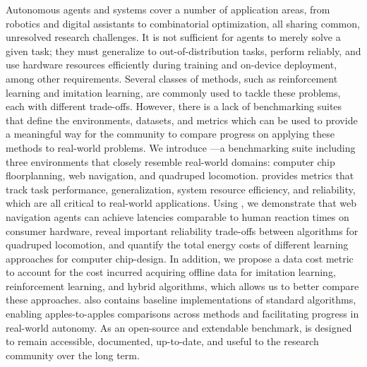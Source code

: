 Autonomous agents and systems cover a number of application areas, from robotics and digital assistants to combinatorial optimization, all sharing common, unresolved research challenges. It is not sufficient for agents to merely solve a given task; they must generalize to out-of-distribution tasks, perform reliably, and use hardware resources efficiently during training and on-device deployment, among other requirements.
Several classes of methods, such as reinforcement learning and imitation learning, are commonly used to tackle these problems, each with different trade-offs.
However, there is a lack of benchmarking suites that define the environments, datasets, and metrics which can be used to provide a meaningful way for the community to compare progress on applying these methods to real-world problems.
We introduce \method—a benchmarking suite including three environments that closely resemble real-world domains: computer chip floorplanning, web navigation, and quadruped locomotion.
\method provides metrics that track task performance, generalization, system resource efficiency, and reliability, which are all critical to real-world applications.
Using \method, we demonstrate that web navigation agents can achieve latencies comparable to human reaction times on consumer hardware,
reveal important reliability trade-offs between algorithms for quadruped locomotion, and quantify the total energy costs of different learning approaches for computer chip-design.
In addition, we propose a data cost metric to account for the cost incurred acquiring offline data for imitation learning, reinforcement learning, and hybrid algorithms, which allows us to better compare these approaches.
\method also contains baseline implementations of standard algorithms, enabling apples-to-apples comparisons across methods and facilitating progress in real-world autonomy.
As an open-source and extendable benchmark, \method is designed to remain accessible, documented, up-to-date, and useful to the research community over the long term.